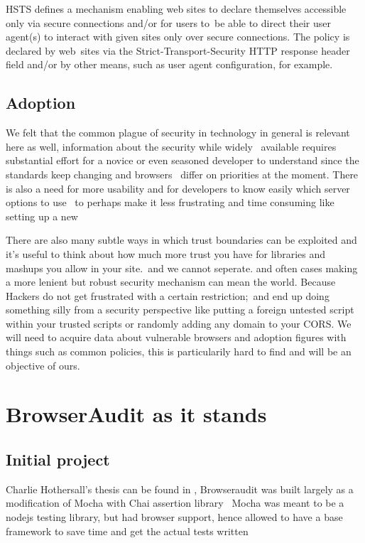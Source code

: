 \documentclass[a4paper,12pt]{paper}
\begin{document}
HSTS defines a mechanism enabling web sites to declare themselves accessible only via secure connections and/or for users to\
be able to direct their user agent(s) to interact with given sites only over secure connections. The policy is declared by web\
sites via the Strict-Transport-Security HTTP response header field and/or by other means, such as user agent configuration, for example.\\

\subsection{Adoption}

We felt that the common plague of security in technology in general is relevant here as well, information about the security while widely \
available requires substantial effort for a novice or even seasoned developer to understand since the standards keep changing and browsers \
differ on priorities at the moment. There is also a need for more usability and for developers to know easily which server options to use \
to perhaps make it less frustrating and time consuming like setting up a new 

There are also many subtle ways in which trust boundaries can be exploited and it's useful to think about how much more trust you have for libraries and mashups you allow in your site.\
and we cannot seperate. and often cases making a more lenient but robust security mechanism can mean the world. Because Hackers do not get frustrated with a certain restriction;\
and end up doing something silly from a security perspective like putting a foreign untested script within your trusted scripts or randomly adding any domain to your CORS.
We will need to acquire data about vulnerable browsers and adoption figures with things such as common policies, this is particularily hard to find and will be an objective of ours.\

\section{BrowserAudit as it stands}


\subsection{Initial project}

Charlie Hothersall's thesis can be found in \cite{charlie} , Browseraudit was built largely as a modification of Mocha with Chai assertion library \
Mocha was meant to be a nodejs testing library, but had browser support, hence allowed to have a base framework to save time and get the actual tests written \
\end{document}

